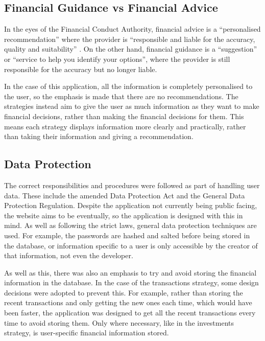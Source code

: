 \subsection{Financial Guidance vs Financial Advice}
In the eyes of the Financial Conduct Authority, financial advice is a ``personalised recommendation'' where the provider is ``responsible and liable for the accuracy, quality and suitability'' \cite{FCA}. On the other hand, financial guidance is a ``suggestion'' or ``service to help you identify your options'', where the provider is still responsible for the accuracy but no longer liable.

In the case of this application, all the information is completely personalised to the user, so the emphasis is made that there are no recommendations. The strategies instead aim to give the user as much information as they want to make financial decisions, rather than making the financial decisions for them. This means each strategy displays information more clearly and practically, rather than taking their information and giving a recommendation.

\subsection{Data Protection}
The correct responsibilities and procedures were followed as part of handling user data. These include the amended Data Protection Act and the General Data Protection Regulation. Despite the application not currently being public facing, the website aims to be eventually, so the application is designed with this in mind. As well as following the strict laws, general data protection techniques are used. For example, the passwords are hashed and salted before being stored in the database, or information specific to a user is only accessible by the creator of that information, not even the developer.

As well as this, there was also an emphasis to try and avoid storing the financial information in the database. In the case of the transactions strategy, some design decisions were adopted to prevent this. For example, rather than storing the recent transactions and only getting the new ones each time, which would have been faster, the application was designed to get all the recent transactions every time to avoid storing them. Only where necessary, like in the investments strategy, is user-specific financial information stored.